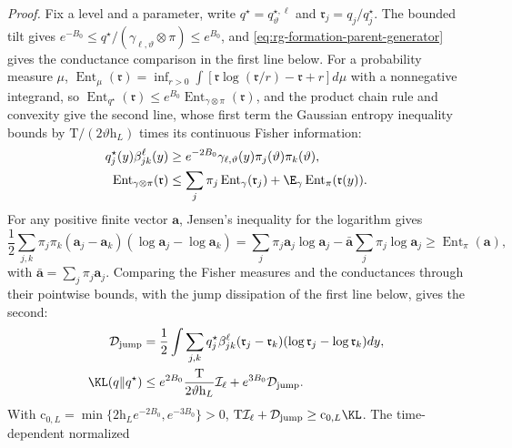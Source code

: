\noindent\emph{Proof.}
Fix a level and a parameter, write \(q^\star=q^{\star,\ell}_\vartheta\) and
\(\mathfrak r_j=q_j/q^\star_j\). The bounded tilt gives
\(e^{-B_0}\le q^\star/(\gamma_{\ell,\vartheta}\otimes\pi)\le e^{B_0}\), and
\cref{eq:rg-formation-parent-generator} gives the conductance comparison in the
first line below. For a probability measure \(\mu\),
\(\operatorname{Ent}_\mu(\mathfrak r)=\inf_{r>0}\int[\mathfrak r\log(\mathfrak r/r)-\mathfrak r+r] d\mu\)
with a nonnegative integrand, so
\(\operatorname{Ent}_{q^\star}(\mathfrak r)\le e^{B_0}\operatorname{Ent}_{\gamma\otimes\pi}(\mathfrak r)\),
and the product chain rule and convexity give the second line, whose first
term the Gaussian entropy inequality bounds by
\(\mathrm T/(2\vartheta\mathrm h_L)\) times its continuous Fisher information:
\begin{align}
 q^\star_j(y)\beta_{jk}^\ell(y)
 &\ge e^{-2B_0}\gamma_{\ell,\vartheta}(y)\pi_j(\vartheta)\pi_k(\vartheta),
 \label{eq:rg-formation-conductance-comparison}\\
 \operatorname{Ent}_{\gamma\otimes\pi}(\mathfrak r)
 &\le\sum_j\pi_j\operatorname{Ent}_\gamma(\mathfrak r_j)
   +\E_\gamma\operatorname{Ent}_{\pi}(\mathfrak r(y)).
 \label{eq:rg-formation-product-entropy-bound}
\end{align}
For any positive finite vector \(\mathbf a\), Jensen's inequality for the
logarithm gives
\begin{equation}
 \frac12\sum_{j,k}\pi_j\pi_k
       (\mathbf a_j-\mathbf a_k)(\log\mathbf a_j-\log\mathbf a_k)
 =\sum_j\pi_j\mathbf a_j\log\mathbf a_j
       -\bar{\mathbf a}\sum_j\pi_j\log\mathbf a_j
 \ge \operatorname{Ent}_\pi(\mathbf a),
 \label{eq:rg-formation-categorical-entropy-bound}
\end{equation}
with \(\bar{\mathbf a}=\sum_j\pi_j\mathbf a_j\). Comparing the Fisher measures
and the conductances through their pointwise bounds, with the jump
dissipation of the first line below, gives the second:
\begin{align}
 \mathcal D_{\mathrm{jump}}
 &=\frac12\int\sum_{j,k}q^\star_j\beta_{jk}^\ell
           (\mathfrak r_j-\mathfrak r_k)(\log\mathfrak r_j-\log\mathfrak r_k) dy,
 \label{eq:rg-formation-jump-dissipation}\\
 \KL(q\Vert q^\star)&\le
 e^{2B_0}\frac{\mathrm T}{2\vartheta\mathrm h_L}\mathcal I_\ell
       +e^{3B_0}\mathcal D_{\mathrm{jump}}.
 \label{eq:rg-formation-joint-coercivity}
\end{align}
With \(\mathrm c_{0,L}=\min\{2\mathrm h_Le^{-2B_0},e^{-3B_0}\}>0\),
\(\mathrm T\mathcal I_\ell+\mathcal D_{\mathrm{jump}}\ge\mathrm c_{0,L}\KL\). The time-dependent normalized
